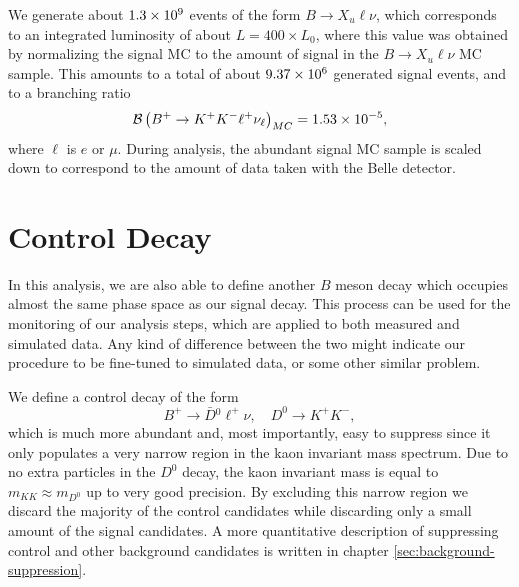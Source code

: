 We generate about $1.3\times 10^{9}$ events of the form $B\to X_u \ell \nu$, which corresponds to an integrated luminosity of about $L = 400\times L_0$, where this value was obtained by normalizing the signal MC to the amount of signal in the $B\to X_u \ell \nu$ MC sample. This amounts to a total of about $9.37\times 10^{6}$ generated signal events, and to a branching ratio
\begin{equation}
\mathcal{B}\left(B^+ \to K^+ K^- \ell^+ \nu_\ell\right)_{MC} = 1.53\times 10^{-5},
\end{equation}
where $\ell$ is $e$ or $\mu$. During analysis, the abundant signal MC sample is scaled down to correspond to the amount of data taken with the Belle detector.

\section{Control Decay}\label{sec:control-decay}

In this analysis, we are also able to define another $B$ meson decay which occupies almost the same phase space as our signal decay. This process can be used for the monitoring of our analysis steps, which are applied to both measured and simulated data. Any kind of difference between the two might indicate our procedure to be fine-tuned to simulated data, or some other similar problem. 

We define a control decay of the form $$B^+ \to \bar D {}^0 \ell^+ \nu, \quad D^0 \to K^+ K^-,$$ which is much more abundant and, most importantly, easy to suppress since it only populates a very narrow region in the kaon invariant mass spectrum. Due to no extra particles in the $D^0$ decay, the kaon invariant mass is equal to $m_{KK} \approx m_{D^0}$ up to very good precision. By excluding this narrow region we discard the majority of the control candidates while discarding only a small amount of the signal candidates. A more quantitative description of suppressing control and other background candidates is written in chapter \ref{sec:background-suppression}.